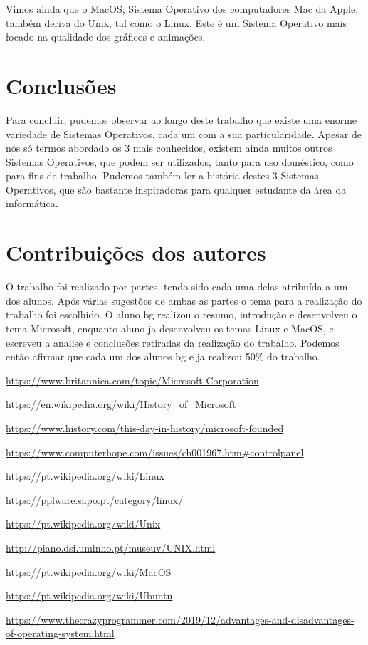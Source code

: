 \documentclass{report}
\begin{document}
Vimos ainda que o MacOS, Sistema Operativo dos computadores Mac da Apple, também deriva do Unix, tal como o Linux. Este é um Sistema Operativo mais focado na qualidade dos gráficos e animações.


\chapter{Conclusões}
\label{chap.conclusao}

Para concluir, pudemos observar ao longo deste trabalho que existe uma enorme variedade de Sistemas Operativos, cada um com a sua particularidade. Apesar de nós só termos abordado os 3 mais conhecidos, existem ainda muitos outros Sistemas Operativos, que podem ser utilizados, tanto para uso doméstico, como para fins de trabalho.
Pudemos também ler a história destes 3 Sistemas Operativos, que são bastante inspiradoras para qualquer estudante da área da informática.

\chapter*{Contribuições dos autores}
O trabalho foi realizado por partes, tendo sido cada uma delas atribuída a um dos alunos. Após várias sugestões de ambas as partes o tema para a realização do trabalho foi escolhido. O aluno \acs{bg} realizou o resumo, introdução e desenvolveu o tema Microsoft, enquanto aluno \acs{ja} desenvolveu os temas Linux e MacOS, e escreveu a analise e conclusões retiradas da realização do trabalho.
Podemos então afirmar que cada um dos alunos \acs{bg} e \acs{ja} realizou 50\% do trabalho.

\begin{thebibliography}{}
\url{https://www.britannica.com/topic/Microsoft-Corporation}

\url{https://en.wikipedia.org/wiki/History_of_Microsoft}

\url{https://www.history.com/this-day-in-history/microsoft-founded}

\url{https://www.computerhope.com/issues/ch001967.htm#controlpanel}

\url{https://pt.wikipedia.org/wiki/Linux}

\url{https://pplware.sapo.pt/category/linux/}

\url{https://pt.wikipedia.org/wiki/Unix}

\url{http://piano.dsi.uminho.pt/museuv/UNIX.html}

\url{https://pt.wikipedia.org/wiki/MacOS}

\url{https://pt.wikipedia.org/wiki/Ubuntu}

\url{https://www.thecrazyprogrammer.com/2019/12/advantages-and-disadvantages-of-operating-system.html}
\end{thebibliography}
\end{document}

